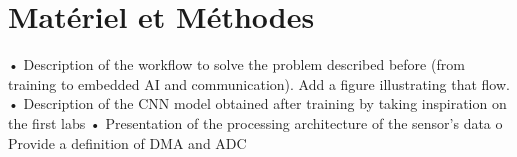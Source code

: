\chapter{Matériel et Méthodes}

• Description of the workflow to solve the problem described before (from training to
embedded AI and communication). Add a figure illustrating that flow.
• Description of the CNN model obtained after training by taking inspiration on the first labs
• Presentation of the processing architecture of the sensor’s data
o Provide a definition of DMA and ADC


